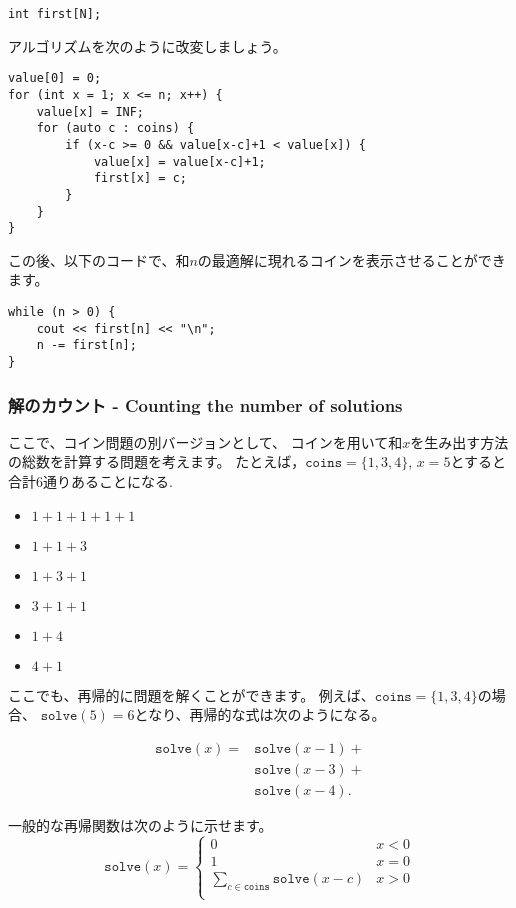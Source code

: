 \begin{lstlisting}
int first[N];
\end{lstlisting}
アルゴリズムを次のように改変しましょう。
\begin{lstlisting}
value[0] = 0;
for (int x = 1; x <= n; x++) {
    value[x] = INF;
    for (auto c : coins) {
        if (x-c >= 0 && value[x-c]+1 < value[x]) {
            value[x] = value[x-c]+1;
            first[x] = c;
        }
    }
}
\end{lstlisting}
この後、以下のコードで、和$n$の最適解に現れるコインを表示させることができます。
\begin{lstlisting}
while (n > 0) {
    cout << first[n] << "\n";
    n -= first[n];
}
\end{lstlisting}

\subsubsection{解のカウント - Counting the number of solutions}

ここで、コイン問題の別バージョンとして、
コインを用いて和$x$を生み出す方法 の総数を計算する問題を考えます。
たとえば，$\texttt{coins}=\{1,3,4\}$, $x=5$とすると
合計6通りあることになる.

\begin{multicols}{2}
\begin{itemize}
\item $1+1+1+1+1$
\item $1+1+3$
\item $1+3+1$
\item $3+1+1$
\item $1+4$
\item $4+1$
\end{itemize}
\end{multicols}

ここでも、再帰的に問題を解くことができます。
例えば、$\texttt{coins}=\{1,3,4\}$の場合、
$\texttt{solve}(5)=6$となり、再帰的な式は次のようになる。

\begin{equation*}
\begin{split}
\texttt{solve}(x) = & \texttt{solve}(x-1) + \\
                    & \texttt{solve}(x-3) + \\
                    & \texttt{solve}(x-4)  .
\end{split}
\end{equation*}

一般的な再帰関数は次のように示せます。
\begin{equation*}
    \texttt{solve}(x) = \begin{cases}
               0               & x < 0\\
               1               & x = 0\\
               \sum_{c \in \texttt{coins}} \texttt{solve}(x-c) & x > 0 \\
           \end{cases}
\end{equation*}

